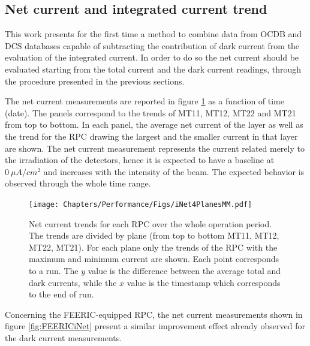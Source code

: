 \subsection{Net current and integrated current trend}
This work presents for the first time a method to combine data from OCDB and DCS databases capable of subtracting the contribution of dark current from the evaluation of the integrated current.
In order to do so the net current should be evaluated starting from the total current and the dark current readings, through the procedure presented in the previous sections.

The net current measurements are reported in figure \ref{fig:iNet4Planes} as a function of time (date).
The panels correspond to the trends of MT11, MT12, MT22 and MT21 from top to bottom.
In each panel, the average net current of the layer as well as the trend for the RPC drawing the largest and the smaller current in that layer are shown.
The net current measurement represents the current related merely to the irradiation of the detectors, hence it is expected to have a baseline at $0\ \mu A/cm^2$ and increases with the intensity of the beam.
The expected behavior is observed through the whole time range.

\begin{figure}[!t]
\begin{center}
\texttt{[image: Chapters/Performance/Figs/iNet4PlanesMM.pdf]}
\caption{Net current trends for each RPC over the whole operation period. The trends are divided by plane (from top to bottom MT11, MT12, MT22, MT21). For each plane only the trends of the RPC with the maximum and minimum current are shown. Each point corresponds to a run. The $y$ value is the difference between the average total and dark currents, while the $x$ value is the timestamp which corresponds to the end of run.}
\label{fig:iNet4Planes}
\end{center}
\end{figure}

Concerning the FEERIC-equipped RPC, the net current measurements shown in figure \ref{fig:FEERICiNet} present a similar improvement effect already observed for the dark current measurements.

